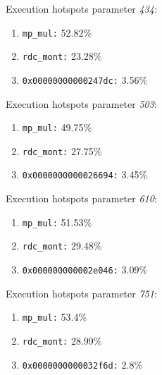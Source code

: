 Execution hotspots parameter \textit{434}:
\begin{enumerate}[noitemsep]
	\item \texttt{mp\_mul:} 52.82\%
	\item \texttt{rdc\_mont:} 23.28\%
	\item \texttt{0x00000000000247dc:} 3.56\%
\end{enumerate}
Execution hotspots parameter \textit{503}:
\begin{enumerate}[noitemsep]
	\item \texttt{mp\_mul:} 49.75\%
	\item \texttt{rdc\_mont:} 27.75\%
	\item \texttt{0x0000000000026694:} 3.45\%
\end{enumerate}
Execution hotspots parameter \textit{610}:
\begin{enumerate}[noitemsep]
	\item \texttt{mp\_mul:} 51.53\%
	\item \texttt{rdc\_mont:} 29.48\%
	\item \texttt{0x000000000002e046:} 3.09\%
\end{enumerate}
Execution hotspots parameter \textit{751}:
\begin{enumerate}[noitemsep]
	\item \texttt{mp\_mul:} 53.4\%
	\item \texttt{rdc\_mont:} 28.99\%
	\item \texttt{0x0000000000032f6d:} 2.8\%
\end{enumerate}
